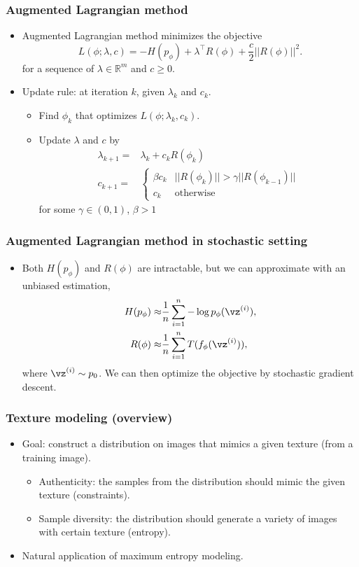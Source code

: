 \documentclass[16pt,presentation]{beamer}
\begin{document}
\begin{frame}
\frametitle{Augmented Lagrangian method}
\begin{itemize}
\item Augmented Lagrangian method minimizes the objective
\[L(\phi; \lambda, c) = - H(p_\phi) + \lambda^{\top} R(\phi) + \dfrac{c}{2}||R(\phi)||^2.\]
for a sequence of $\lambda \in \mathbb{R}^m$ and $c \geq 0$.
\item Update rule: at iteration $k$, given $\lambda_k$ and $c_k$.
\begin{itemize}
\item Find $\phi_k$ that optimizes $L(\phi; \lambda_k, c_k)$.
\item Update $\lambda$ and $c$ by
\[\begin{split}
\lambda_{k+1} =& \lambda_k + c_k R(\phi_k)\\
c_{k+1} =&\begin{cases}
\beta c_{k} & ||R(\phi_{k})||>\gamma ||R(\phi_{k-1})|| \\
c_k & \text{otherwise}
\end{cases}
\end{split}\]
for some $\gamma \in (0,1)$, $\beta > 1$
\end{itemize}
\end{itemize}
\end{frame}

\begin{frame}
\frametitle{Augmented Lagrangian method in stochastic setting}
\begin{itemize}
\item Both $H(p_\phi)$ and $R(\phi)$ are intractable, but we can approximate with an unbiased estimation,
\[\begin{split}
H(p_\phi) \approx& \frac{1}{n} \sum_{i=1}^n -\log p_\phi(\vz^{(i)}),\\
R(\phi) \approx& \frac{1}{n} \sum_{i=1}^nT(f_\phi( \vz^{(i)})),
\end{split}\]
where $\vz^{(i)} \sim p_0$. We can then optimize the objective by stochastic gradient descent.
\end{itemize}
\end{frame}

\begin{frame}
\frametitle{Texture modeling (overview)}
\begin{itemize}
\item Goal: construct a distribution on images that mimics a given texture (from a training image).
\begin{itemize}
\item Authenticity: the samples from the distribution should mimic the given texture (constraints).
\item Sample diversity: the distribution should generate a variety of images with certain texture (entropy).
\end{itemize}
\item Natural application of maximum entropy modeling.
\end{itemize}
\end{frame}
\end{document}
